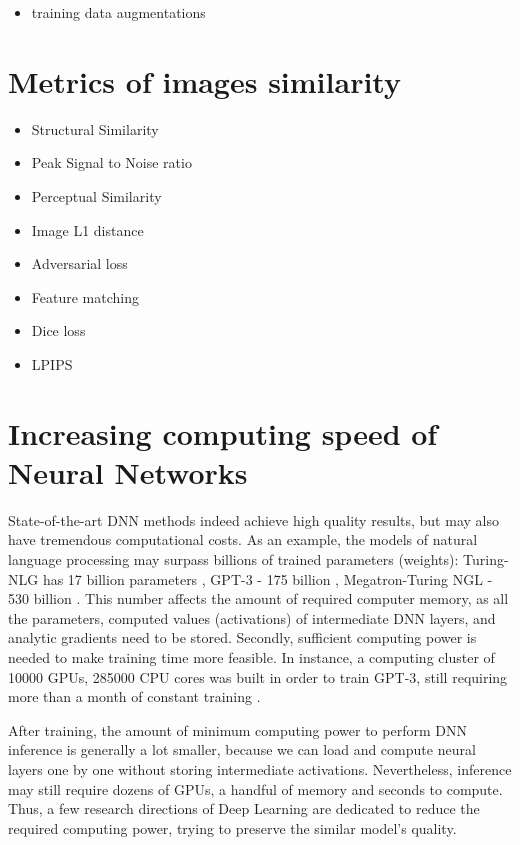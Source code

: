 \begin{itemize}
	\item training data augmentations
	
\end{itemize}

\section{Metrics of images similarity}
\label{lit:metrics}
\begin{itemize}
	\item Structural Similarity
	\item Peak Signal to Noise ratio
	\item Perceptual Similarity
	\item Image L1 distance
	\item Adversarial loss
	\item Feature matching
	\item Dice loss
	\item LPIPS
\end{itemize}

\section{Increasing computing speed of Neural Networks}
\label{lit:dnn-speedup}

State-of-the-art DNN methods indeed achieve high quality results, but may also have tremendous computational costs. As an example, the models of natural language processing may surpass billions of trained parameters (weights): Turing-NLG has 17 billion parameters \cite{dnn:turingnlg20}, GPT-3 - 175 billion \cite{dnn:gpt3-20}, Megatron-Turing NGL - 530 billion \cite{dnn:megatron22}. This number affects the amount of required computer memory, as all the parameters, computed values (activations) of intermediate DNN layers, and analytic gradients need to be stored. Secondly, sufficient computing power is needed to make training time more feasible. In instance, a computing cluster of 10000 GPUs, 285000 CPU cores was built in order to train GPT-3, still requiring more than a month of constant training \cite{aux:openai-cluster-20}. 

After training, the amount of minimum computing power to perform DNN inference is generally a lot smaller, because we can load and compute neural layers one by one without storing intermediate activations. Nevertheless, inference may still require dozens of GPUs, a handful of memory and seconds to compute. Thus, a few research directions of Deep Learning are dedicated to reduce the required computing power, trying to preserve the similar model's quality.

